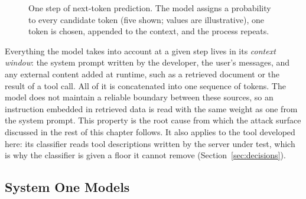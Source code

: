 \begin{figure}[htbp]
\centering
{}
\caption[One step of next-token prediction]{One step of next-token prediction. The model assigns a probability to every candidate token (five shown; values are illustrative), one token is chosen, appended to the context, and the process repeats.\llmgen}
\label{fig:next-token}
\end{figure}

Everything the model takes into account at a given step lives in its \emph{context window}: the system prompt written by the developer, the user's messages, and any external content added at runtime, such as a retrieved document or the result of a tool call. All of it is concatenated into one sequence of tokens. The model does not maintain a reliable boundary between these sources, so an instruction embedded in retrieved data is read with the same weight as one from the system prompt. This property is the root cause from which the attack surface discussed in the rest of this chapter follows. It also applies to the tool developed here: its classifier reads tool descriptions written by the server under test, which is why the classifier is given a floor it cannot remove (Section~\ref{sec:decisions}).

\subsection{System One Models}
\label{sec:system-one}

